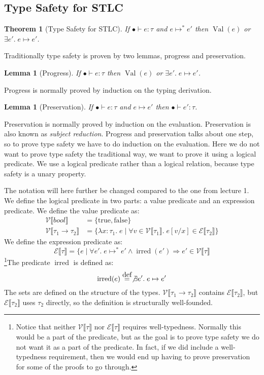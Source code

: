 \documentclass[a4paper,10pt,fleqn]{article}
\newcommand{\sem}[1]{\ensuremath{\llbracket #1 \rrbracket}}
\newcommand{\curly}[1]{\ensuremath{\mathcal{#1}}}
\DeclareMathOperator{\irred}{irred}
\DeclareMathOperator{\val}{Val}
\newcommand{\evalto}{\ensuremath{\mapsto}}
\newcommand{\evaltos}{\ensuremath{\evalto^*}}
\newcommand{\mtenv}{\ensuremath{\bullet}}
\newcommand{\eqdef}{\ensuremath{ \; \stackrel{\mathclap{\normalfont\mbox{def}}}{=} \;}}
\newcommand{\tlabs}[3]{\ensuremath{\lambda #1 : #2 . \; #3 }}
\newcommand{\vbar}{\ensuremath{\; | \;}}
\newcommand{\tarrow}[2]{\ensuremath{ #1 \rightarrow #2}}
\newcommand{\true}{\ensuremath{\text{true}}}
\newcommand{\false}{\ensuremath{\text{false}}}
\newcommand{\epred}[1]{\ensuremath{\curly{E}\sem{#1}}}
\newcommand{\vpred}[1]{\ensuremath{\curly{V}\sem{#1}}}
\newtheorem*{stlctypesafety}{Theorem}
\newtheorem*{progress}{Lemma}
\newtheorem*{preservation}{Lemma}
\begin{document}
\subsection*{Type Safety for STLC}
\begin{stlctypesafety}[Type Safety for STLC]
  If $\mtenv \vdash e : \tau$ and $e \evaltos e'$ then $\val(e)$ or $\exists e'. \; e \evalto e'$.
\end{stlctypesafety}
Traditionally type safety is proven by two lemmas, progress and preservation.
\begin{progress}[Progress]
  If $\mtenv \vdash e : \tau$ then $\val(e)$ or $\exists e'. \; e \evalto e'$.
\end{progress}
Progress is normally proved by induction on the typing derivation.
\begin{preservation}[Preservation]
  If $\mtenv \vdash e : \tau$ and $e \evalto e'$ then $\mtenv \vdash e' : \tau$.
\end{preservation}
Preservation is normally proved by induction on the evaluation.
Preservation is also known as \emph{subject reduction}. Progress and preservation talks about one step, so to prove type safety we have to do induction on the evaluation. Here we do not want to prove type safety the traditional way, we want to prove it using a logical predicate. We use a logical predicate rather than a logical relation, because type safety is a unary property.

The notation will here further be changed compared to the one from lecture 1. We define the logical predicate in two parts: a value predicate and an expression predicate. We define the value predicate as:
\begin{align*}
  \vpred{bool} & = \{ \true, \false \}\\
  \vpred{\tarrow{\tau_1}{\tau_2}} & = \{\tlabs{x}{\tau_1}{e} \vbar \forall v \in \curly{V}\sem{\tau_1}.\; e [v/x] \in \curly{E}\sem{\tau_2}\}
\end{align*}
We define the expression predicate as:
\[
  \epred{\tau} = \{e \vbar \forall e'. \; e \evaltos e' \wedge \irred(e') \Rightarrow e' \in \curly{V}\sem{\tau}
\]
\footnote{Notice that neither \vpred{\tau} nor \epred{\tau} requires well-typedness. Normally this would be a part of the predicate, but as the goal is to prove type safety we do not want it as a part of the predicate. In fact, if we did include a well-typedness requirement, then we would end up having to prove preservation for some of the proofs to go through.}The predicate $\irred$ is defined as:
\[
  \irred(e) \eqdef \not\exists e'. \; e \evalto e'
\]
The sets are defined on the structure of the types. \vpred{\tarrow{\tau_1}{\tau_2}} contains \epred{\tau_2}, but \epred{\tau_2} uses $\tau_2$ directly, so the definition is structurally well-founded. 
\end{document}
